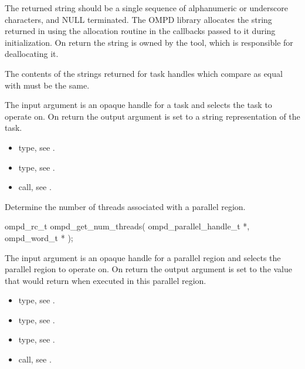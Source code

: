 \descr
The returned string should be a single sequence of alphanumeric or underscore characters, and
NULL terminated. The OMPD library allocates the string returned in 
using the allocation routine in the callbacks passed to it during initialization. On return the string is
owned by the tool, which is responsible for deallocating it.

The contents of the strings returned for task handles which compare as equal with
 must be the same.

\argdesc
The input argument  is an opaque handle for a task and selects the task to operate on.
On return the output argument  is set to a string representation of the task.

\crossreferences
\begin{itemize}
  \item {} type, see .
	\item {} type, see .
	\item {} call, see .
\end{itemize}



\label{subsubsubsec:ompd_get_num_threads}
\summary
Determine the number of threads associated with a parallel region.

\format
\begin{cspecific}
\begin{ompSyntax}
ompd_rc_t ompd_get_num_threads(
  ompd_parallel_handle_t *,
  ompd_word_t *
);
\end{ompSyntax}
\end{cspecific}

\descr

\argdesc
The input argument  is an opaque handle for a parallel region and selects the parallel region to operate on.
On return the output argument  is set to the value that  would return when
executed in this parallel region.

\crossreferences
\begin{itemize}
  \item {} type, see .
	\item {} type, see .
	\item {} type, see .
	\item {} call, see .
\end{itemize}

